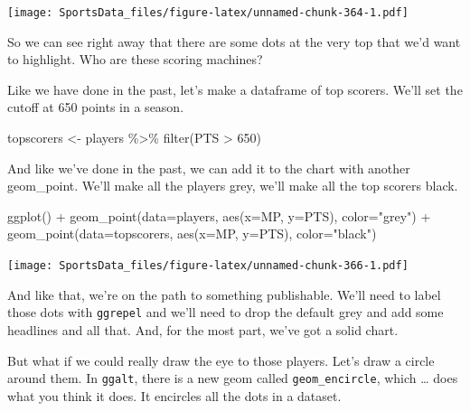 \documentclass[
]{book}
\newenvironment{Shaded}{\begin{snugshade}}{\end{snugshade}}
\newcommand{\AttributeTok}[1]{\textcolor[rgb]{0.77,0.63,0.00}{#1}}
\newcommand{\DecValTok}[1]{\textcolor[rgb]{0.00,0.00,0.81}{#1}}
\newcommand{\FunctionTok}[1]{\textcolor[rgb]{0.00,0.00,0.00}{#1}}
\newcommand{\NormalTok}[1]{#1}
\newcommand{\OtherTok}[1]{\textcolor[rgb]{0.56,0.35,0.01}{#1}}
\newcommand{\SpecialCharTok}[1]{\textcolor[rgb]{0.00,0.00,0.00}{#1}}
\newcommand{\StringTok}[1]{\textcolor[rgb]{0.31,0.60,0.02}{#1}}
\begin{document}
\texttt{[image: SportsData\_files/figure-latex/unnamed-chunk-364-1.pdf]}

So we can see right away that there are some dots at the very top that we'd want to highlight. Who are these scoring machines?

Like we have done in the past, let's make a dataframe of top scorers. We'll set the cutoff at 650 points in a season.

\begin{Shaded}
\begin{Highlighting}[]
\NormalTok{topscorers }\OtherTok{\textless{}{-}}\NormalTok{ players }\SpecialCharTok{\%\textgreater{}\%} \FunctionTok{filter}\NormalTok{(PTS }\SpecialCharTok{\textgreater{}} \DecValTok{650}\NormalTok{)}
\end{Highlighting}
\end{Shaded}

And like we've done in the past, we can add it to the chart with another geom\_point. We'll make all the players grey, we'll make all the top scorers black.

\begin{Shaded}
\begin{Highlighting}[]
\FunctionTok{ggplot}\NormalTok{() }\SpecialCharTok{+} \FunctionTok{geom\_point}\NormalTok{(}\AttributeTok{data=}\NormalTok{players, }\FunctionTok{aes}\NormalTok{(}\AttributeTok{x=}\NormalTok{MP, }\AttributeTok{y=}\NormalTok{PTS), }\AttributeTok{color=}\StringTok{"grey"}\NormalTok{) }\SpecialCharTok{+} \FunctionTok{geom\_point}\NormalTok{(}\AttributeTok{data=}\NormalTok{topscorers, }\FunctionTok{aes}\NormalTok{(}\AttributeTok{x=}\NormalTok{MP, }\AttributeTok{y=}\NormalTok{PTS), }\AttributeTok{color=}\StringTok{"black"}\NormalTok{)}
\end{Highlighting}
\end{Shaded}

\texttt{[image: SportsData\_files/figure-latex/unnamed-chunk-366-1.pdf]}

And like that, we're on the path to something publishable. We'll need to label those dots with \texttt{ggrepel} and we'll need to drop the default grey and add some headlines and all that. And, for the most part, we've got a solid chart.

But what if we could really draw the eye to those players. Let's draw a circle around them.
In \texttt{ggalt}, there is a new geom called \texttt{geom\_encircle}, which \ldots{} does what you think it does. It encircles all the dots in a dataset.
\end{document}
